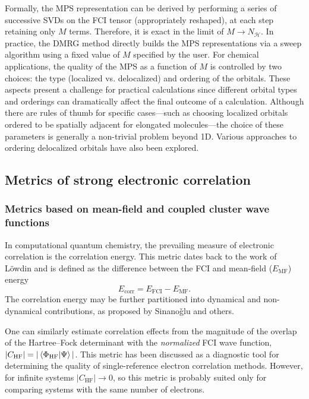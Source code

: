 \documentclass[aip,jcp,amsmath,amssymb, preprint]{revtex4-1}
\newcommand*{\nfci}{N_\mathcal{H}}
\begin{document}
Formally, the MPS representation can be derived by performing a series of successive SVDs on the FCI tensor (appropriately reshaped), at each step retaining only $M$ terms.
Therefore, it is exact in the limit of $M \rightarrow \nfci$.
In practice, the DMRG method directly builds the MPS representations via a sweep algorithm using a fixed value of $M$ specified by the user.
For chemical applications, the quality of the MPS as a function of $M$ is controlled by two choices: the type (localized vs. delocalized) and ordering of the orbitals. These aspects present a challenge for practical calculations since different orbital types and orderings can dramatically affect the final outcome of a calculation. Although there are rules of thumb for specific cases---such as choosing localized orbitals ordered to be spatially adjacent for elongated molecules\cite{Wouters2014TheDensity}---the choice of these parameters is generally a non-trivial problem beyond 1D. 
Various approaches to ordering delocalized orbitals have also been explored.\cite{legeza2003controlling,moritz2005convergence,Legeza2003OptemizingThe,Rissler2006MeasuringOrbital}


\subsection{\label{metrics_of_correlation}Metrics of strong electronic correlation}

\subsubsection{Metrics based on mean-field and coupled cluster wave functions}

In computational quantum chemistry, the prevailing measure of electronic correlation is the correlation energy. This metric dates back to the work of L{\"o}wdin \cite{lowdin1958correlation} and is defined as the difference between the FCI and mean-field ($E_{\text{MF}}$) energy
\begin{equation}
E_{\text{corr}} = E_{\text{FCI}} - E_{\text{MF}}.
\label{eq:cor_energy}
\end{equation}
The correlation energy may be further partitioned into dynamical and non-dynamical contributions, as proposed by Sinano{\v g}lu and others.\cite{Sinanoglu1964QuantumTheory,bartlett1994applications}

One can similarly estimate correlation effects from the magnitude of the overlap of the Hartree--Fock determinant with the \textit{normalized} FCI wave function, $|C_\mathrm{HF}| = |\braket{\Phi_{\mathrm{HF}}|\Psi}|$.
This metric has been discussed as a diagnostic tool for determining the quality of single-reference electron correlation methods.\cite{lee1989diagnostic}
However, for infinite systems $|C_\mathrm{HF}| \rightarrow 0$, so this metric is probably suited only for comparing systems with the same number of electrons.
\end{document}
